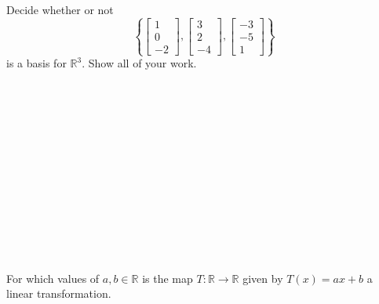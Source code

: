 \documentclass[12pt]{exam}
\begin{document}
\begin{questions}
\question[25] Decide whether or not 
\begin{equation*}
\left\{
\begin{bmatrix}
1\\
0\\
-2
\end{bmatrix}, 
\begin{bmatrix}
3\\
2\\
-4
\end{bmatrix}, 
\begin{bmatrix}
-3\\
-5\\
1
\end{bmatrix}
\right\}
\end{equation*}
is a basis for $\mathbb{R}^3$. Show all of your work.
\addpoints
\\\\
\\\\
\\\\
\\\\
\\\\
\\\\
\\\\


\question[25] For which values of $a,b\in \mathbb{R}$ is the map $T:\mathbb{R}\to \mathbb{R}$ given by $T(x)=ax+b$ a linear transformation.



\end{questions}
\end{document}
